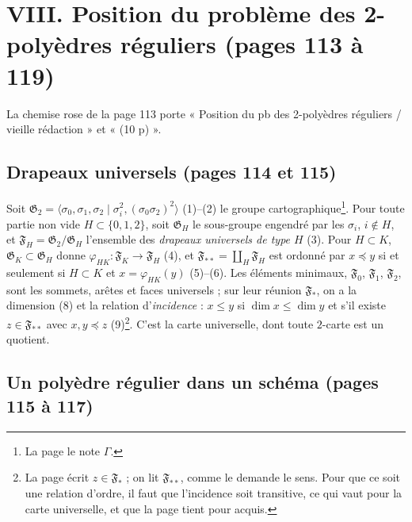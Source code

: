 \documentclass[11pt,a4paper]{article}
\begin{document}
\section*{VIII. Position du problème des 2-polyèdres réguliers (pages 113 à 119)}

La chemise rose de la page 113 porte « Position du pb des 2-polyèdres réguliers
/ vieille rédaction » et « (10 p) ».

\subsection*{Drapeaux universels (pages 114 et 115)}

Soit $\mathfrak{G}_2 = \langle \sigma_0, \sigma_1, \sigma_2 \mid \sigma_i^2,
(\sigma_0\sigma_2)^2 \rangle$ (1)--(2) le groupe cartographique\footnote{La page
le note $\Gamma$.}. Pour toute partie non vide $H \subset \{0, 1, 2\}$, soit
$\mathfrak{G}_H$ le sous-groupe engendré par les $\sigma_i$, $i \notin H$, et
$\mathfrak{F}_H = \mathfrak{G}_2 / \mathfrak{G}_H$ l'ensemble des \emph{drapeaux
universels de type $H$} (3). Pour $H \subset K$, $\mathfrak{G}_K \subset
\mathfrak{G}_H$ donne $\varphi_{HK} : \mathfrak{F}_K \to \mathfrak{F}_H$ (4), et
$\mathfrak{F}_{**} = \coprod_H \mathfrak{F}_H$ est ordonné par $x \preccurlyeq y$
si et seulement si $H \subset K$ et $x = \varphi_{HK}(y)$ (5)--(6). Les éléments
minimaux, $\mathfrak{F}_0$, $\mathfrak{F}_1$, $\mathfrak{F}_2$, sont les
sommets, arêtes et faces universels ; sur leur réunion $\mathfrak{F}_*$, on a la
dimension (8) et la relation d'\emph{incidence} : $x \leq y$ si $\dim x \leq
\dim y$ et s'il existe $z \in \mathfrak{F}_{**}$ avec $x, y \preccurlyeq z$
(9)\footnote{La page écrit $z \in \mathfrak{F}_*$ ; on lit
$\mathfrak{F}_{**}$, comme le demande le sens. Pour que ce soit une relation
d'ordre, il faut que l'incidence soit transitive, ce qui vaut pour la carte
universelle, et que la page tient pour acquis.}. C'est la carte universelle,
dont toute $2$-carte est un quotient.

\subsection*{Un polyèdre régulier dans un schéma (pages 115 à 117)}
\end{document}
